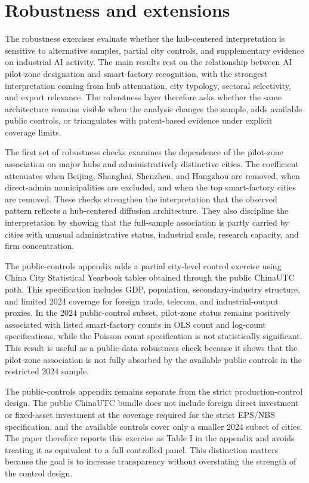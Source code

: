 \documentclass[12pt]{article}
\begin{document}
\section{Robustness and extensions}
\label{sec:robustness}

The robustness exercises evaluate whether the hub-centered interpretation is sensitive to alternative samples, partial city controls, and supplementary evidence on industrial AI activity. The main results rest on the relationship between AI pilot-zone designation and smart-factory recognition, with the strongest interpretation coming from hub attenuation, city typology, sectoral selectivity, and export relevance. The robustness layer therefore asks whether the same architecture remains visible when the analysis changes the sample, adds available public controls, or triangulates with patent-based evidence under explicit coverage limits.

The first set of robustness checks examines the dependence of the pilot-zone association on major hubs and administratively distinctive cities. The coefficient attenuates when Beijing, Shanghai, Shenzhen, and Hangzhou are removed, when direct-admin municipalities are excluded, and when the top smart-factory cities are removed. These checks strengthen the interpretation that the observed pattern reflects a hub-centered diffusion architecture. They also discipline the interpretation by showing that the full-sample association is partly carried by cities with unusual administrative status, industrial scale, research capacity, and firm concentration.

The public-controls appendix adds a partial city-level control exercise using China City Statistical Yearbook tables obtained through the public ChinaUTC path. This specification includes GDP, population, secondary-industry structure, and limited 2024 coverage for foreign trade, telecom, and industrial-output proxies. In the 2024 public-control subset, pilot-zone status remains positively associated with listed smart-factory counts in OLS count and log-count specifications, while the Poisson count specification is not statistically significant. This result is useful as a public-data robustness check because it shows that the pilot-zone association is not fully absorbed by the available public controls in the restricted 2024 sample.

The public-controls appendix remains separate from the strict production-control design. The public ChinaUTC bundle does not include foreign direct investment or fixed-asset investment at the coverage required for the strict EPS/NBS specification, and the available controls cover only a smaller 2024 subset of cities. The paper therefore reports this exercise as Table I in the appendix and avoids treating it as equivalent to a full controlled panel. This distinction matters because the goal is to increase transparency without overstating the strength of the control design.
\end{document}
